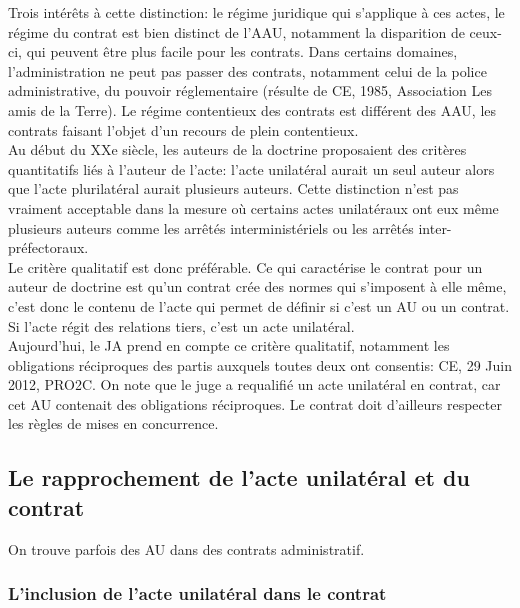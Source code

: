 \documentclass[10pt, a4paper, openany]{book}
\begin{document}
Trois intérêts à cette distinction: le régime juridique qui s'applique à ces actes, le régime du contrat est bien distinct de l'AAU, notamment la disparition de ceux-ci, qui peuvent être plus facile pour les contrats. Dans certains domaines, l'administration ne peut pas passer des contrats, notamment celui de la police administrative, du pouvoir réglementaire (résulte de CE, 1985, Association Les amis de la Terre). Le régime contentieux des contrats est différent des AAU, les contrats faisant l'objet d'un recours de plein contentieux. \\
Au début du XXe siècle, les auteurs de la doctrine proposaient des critères quantitatifs liés à l'auteur de l'acte: l'acte unilatéral aurait un seul auteur alors que l'acte plurilatéral aurait plusieurs auteurs. Cette distinction n'est pas vraiment acceptable dans la mesure où certains actes unilatéraux ont eux même plusieurs auteurs comme les arrêtés interministériels ou les arrêtés inter-préfectoraux. \\
Le critère qualitatif est donc préférable. Ce qui caractérise le contrat pour un auteur de doctrine est qu'un contrat crée des normes qui s'imposent à elle même, c'est donc le contenu de l'acte qui permet de définir si c'est un AU ou un contrat. Si l'acte régit des relations tiers, c'est un acte unilatéral. \\
Aujourd'hui, le JA prend en compte ce critère qualitatif, notamment les obligations réciproques des partis auxquels toutes deux ont consentis: CE, 29 Juin 2012, PRO2C. On note que le juge a requalifié un acte unilatéral en contrat, car cet AU contenait des obligations réciproques. Le contrat doit d'ailleurs respecter les règles de mises en concurrence. 

\subsection{Le rapprochement de l'acte unilatéral et du contrat}

On trouve parfois des AU dans des contrats administratif.

\subsubsection{L'inclusion de l'acte unilatéral dans le contrat}
\end{document}
